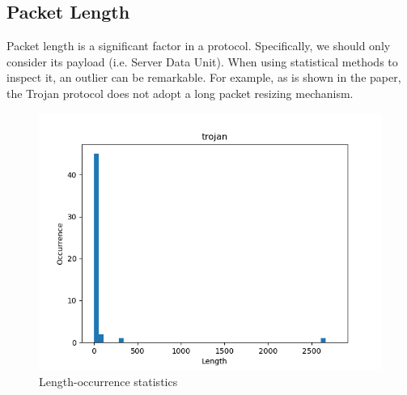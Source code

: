 \subsection{Packet Length}
\begin{frame}
    
    Packet length is a significant factor in a protocol. Specifically, we should only consider its payload (i.e. Server Data Unit).
    When using statistical methods to inspect it, an outlier can be remarkable. For example, as is shown in the paper, the Trojan protocol does not adopt a long packet resizing mechanism.
\begin{figure}[H]
    \centering
        \includegraphics[scale=0.45]{pics/occurrence_of_length_trojan.png}
    \caption{Length-occurrence statistics}
\end{figure}
\end{frame}

